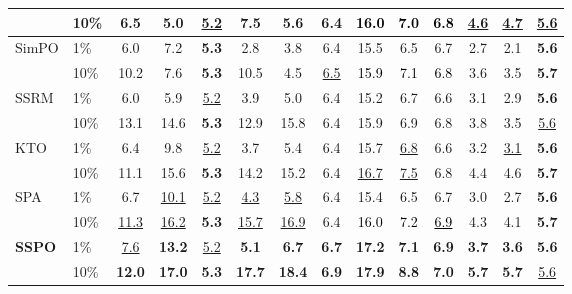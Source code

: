 \documentclass{article} %
\newcommand\rebuttal[1]{\textcolor{black}{#1}}
\begin{document}
\begin{table}[t]
\begin{tabular}{ll ccc ccc ccc ccc}
        & 10\% & 6.5 & 5.0 & \underline{5.2} & 7.5 & 5.6 & 6.4 & \rebuttal{16.0} & \rebuttal{7.0} & \rebuttal{6.8} & \underline{4.6} & \underline{4.7} & \underline{5.6} \\
        \midrule
        SimPO & 1\% & 6.0 & 7.2 & \textbf{5.3} & 2.8 & 3.8 & 6.4 & 15.5 & 6.5 & 6.7 & 2.7 & 2.1 & \textbf{5.6} \\
        & 10\% & 10.2 & 7.6 & \textbf{5.3} & 10.5 & 4.5 & \underline{6.5} & \rebuttal{15.9} & \rebuttal{7.1} & \rebuttal{6.8} & 3.6 & 3.5 & \textbf{5.7} \\
        \midrule
        SSRM & 1\% & 6.0 & 5.9 & \underline{5.2} & 3.9 & 5.0 & 6.4 & 15.2 & 6.7 & 6.6 & 3.1 & 2.9 & \textbf{5.6} \\
        & 10\% & 13.1 & 14.6 & \textbf{5.3} & 12.9 & 15.8 & 6.4 & 15.9 & 6.9 & 6.8 & 3.8 & 3.5 & \underline{5.6} \\
        \midrule
        KTO & 1\% & 6.4  & 9.8  & \underline{5.2}  & 3.7 & 5.4  & 6.4 & 15.7 & \underline{6.8} & 6.6 & 3.2 & \underline{3.1} & \textbf{5.6} \\
        & 10\% & 11.1 & 15.6 & \textbf{5.3} & 14.2 & 15.2 & 6.4 & \underline{16.7} & \underline{7.5} & 6.8 & 4.4 & 4.6 & \textbf{5.7} \\
        \midrule
        SPA & 1\% & 6.7 & \underline{10.1} & \underline{5.2} & \underline{4.3} & \underline{5.8} & 6.4 & 15.4 & 6.5 & 6.7 & 3.0 & 2.7 & \textbf{5.6}  \\
        & 10\% & \underline{11.3} & \underline{16.2} & \textbf{5.3} & \underline{15.7} & \underline{16.9} & 6.4 & \rebuttal{16.0} & \rebuttal{7.2} & \rebuttal{\underline{6.9}} & 4.3 & 4.1 & \textbf{5.7} \\
        \midrule
        \midrule
        \textbf{SSPO} & 1\% & \underline{7.6} & \textbf{13.2} & \underline{5.2} & \textbf{5.1} & \textbf{6.7} & \textbf{6.7} & \textbf{17.2} & \textbf{7.1} & \textbf{6.9} & \textbf{3.7} & \textbf{3.6} & \textbf{5.6} \\
        & 10\% & \textbf{12.0} & \textbf{17.0} & \textbf{5.3} & \textbf{17.7} & \textbf{18.4} & \textbf{6.9} & \textbf{17.9} & \textbf{8.8} & \textbf{7.0} & \textbf{5.7} & \textbf{5.7} & \underline{5.6} \\
        \bottomrule
    \end{tabular}
\end{table}
\end{document}
